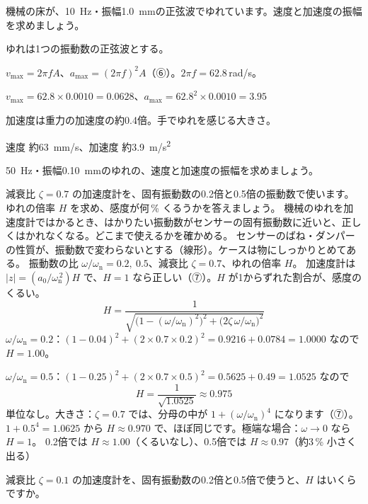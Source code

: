\begin{reidai}[ゆれの速度と加速度]
\label{ph:波-10:ex10}機械の床が、\qty{10}{Hz}・振幅\qty{1.0}{mm}の正弦波でゆれています。速度と加速度の振幅を求めましょう。
\par{} ゆれは1つの振動数の正弦波とする。
\par\kangaekata $v_{\max}=2\pi fA$、$a_{\max}=(2\pi f)^2A$（⑥）。$2\pi f=62.8$\,rad/s。
\par\shiki $v_{\max}=62.8\times0.0010=0.0628$、$a_{\max}=62.8^2\times0.0010=3.95$
\par{} 加速度は重力の加速度の約0.4倍。手でゆれを感じる大きさ。
\par\kotae 速度 約\qty{63}{mm/s}、加速度 約\qty{3.9}{m/s^2}
\end{reidai}
\begin{jibun}
\qty{50}{Hz}・振幅\qty{0.10}{mm}のゆれの、速度と加速度の振幅を求めましょう。
\end{jibun}

\begin{phreidai}[加速度計の感度のくるい]
\label{ph:波-10:ex11}減衰比 $\zeta=0.7$ の加速度計を、固有振動数の0.2倍と0.5倍の振動数で使います。ゆれの倍率 $H$ を求め、感度が何\,\% くるうかを答えましょう。
\phbamen
機械のゆれを加速度計ではかるとき、はかりたい振動数がセンサーの固有振動数に近いと、正しくはかれなくなる。どこまで使えるかを確かめる。
\phmushi
センサーのばね・ダンパーの性質が、振動数で変わらないとする（線形）。ケースは物にしっかりとめてある。
\phzu
振動数の比 $\omega/\omega_{\mathrm n}=0.2,\ 0.5$、減衰比 $\zeta=0.7$、ゆれの倍率 $H$。
\phriyu
加速度計は $|z|=(a_0/\omega_{\mathrm n}^{\,2})H$ で、$H=1$ なら正しい（⑦）。$H$ が1からずれた割合が、感度のくるい。
\phtateru
\[ H=\frac{1}{\sqrt{\bigl(1-(\omega/\omega_{\mathrm n})^2\bigr)^2+\bigl(2\zeta\,\omega/\omega_{\mathrm n}\bigr)^2}} \]
\phtoku
$\omega/\omega_{\mathrm n}=0.2$：$(1-0.04)^2+(2\times0.7\times0.2)^2=0.9216+0.0784=1.0000$ なので $H=1.00$。

$\omega/\omega_{\mathrm n}=0.5$：$(1-0.25)^2+(2\times0.7\times0.5)^2=0.5625+0.49=1.0525$ なので
\[ H=\frac{1}{\sqrt{1.0525}}\approx0.975 \]
\phtashikame
単位なし。大きさ：$\zeta=0.7$ では、分母の中が $1+(\omega/\omega_{\mathrm n})^4$ になります（⑦）。$1+0.5^4=1.0625$ から $H\approx0.970$ で、ほぼ同じです。極端な場合：$\omega\to0$ なら $H=1$。
\kotae 0.2倍では $H\approx1.00$（くるいなし）、0.5倍では $H\approx0.97$（約3\,\% 小さく出る）
\end{phreidai}
\begin{jibun}
減衰比 $\zeta=0.1$ の加速度計を、固有振動数の0.2倍と0.5倍で使うと、$H$ はいくらですか。
\end{jibun}

